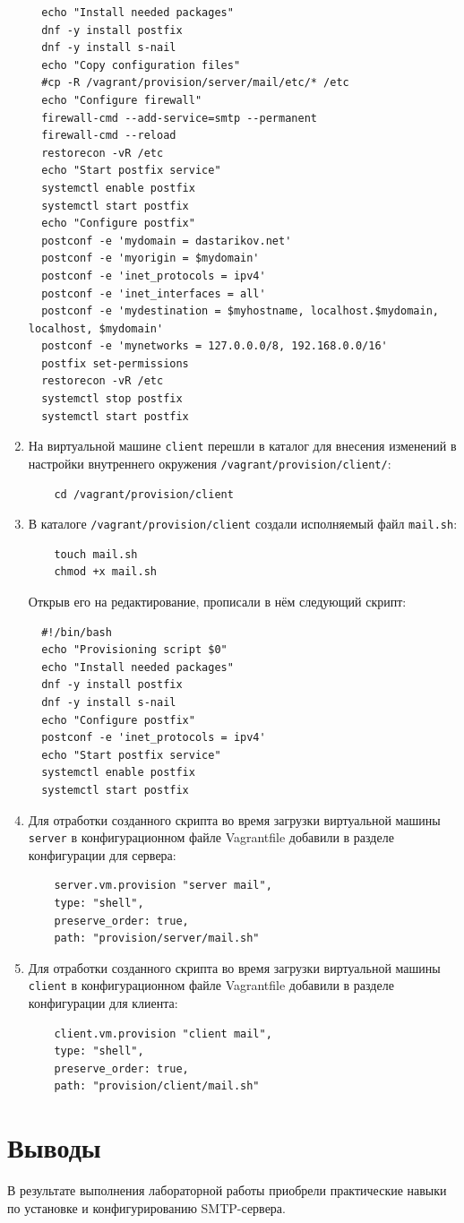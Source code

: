 \begin{enumerate}
\begin{verbatim}
  echo "Install needed packages"
  dnf -y install postfix
  dnf -y install s-nail
  echo "Copy configuration files"
  #cp -R /vagrant/provision/server/mail/etc/* /etc
  echo "Configure firewall"
  firewall-cmd --add-service=smtp --permanent
  firewall-cmd --reload
  restorecon -vR /etc
  echo "Start postfix service"
  systemctl enable postfix
  systemctl start postfix
  echo "Configure postfix"
  postconf -e 'mydomain = dastarikov.net'
  postconf -e 'myorigin = $mydomain'
  postconf -e 'inet_protocols = ipv4'
  postconf -e 'inet_interfaces = all'
  postconf -e 'mydestination = $myhostname, localhost.$mydomain, localhost, $mydomain'
  postconf -e 'mynetworks = 127.0.0.0/8, 192.168.0.0/16'
  postfix set-permissions
  restorecon -vR /etc
  systemctl stop postfix
  systemctl start postfix
\end{verbatim}
\item На виртуальной машине \texttt{client} перешли в каталог для внесения изменений в настройки внутреннего окружения \texttt{/vagrant/provision/client/}:
  \begin{verbatim}
    cd /vagrant/provision/client
  \end{verbatim}
\item В каталоге \texttt{/vagrant/provision/client} создали исполняемый файл \texttt{mail.sh}:
  \begin{verbatim}
    touch mail.sh
    chmod +x mail.sh
  \end{verbatim}
Открыв его на редактирование, прописали в нём следующий скрипт:
\begin{verbatim}
  #!/bin/bash
  echo "Provisioning script $0"
  echo "Install needed packages"
  dnf -y install postfix
  dnf -y install s-nail
  echo "Configure postfix"
  postconf -e 'inet_protocols = ipv4'
  echo "Start postfix service"
  systemctl enable postfix
  systemctl start postfix
\end{verbatim}

\item Для отработки созданного скрипта во время загрузки виртуальной машины \texttt{server} в конфигурационном файле Vagrantfile добавили в разделе конфигурации для сервера:
  \begin{verbatim}
    server.vm.provision "server mail",
    type: "shell",
    preserve_order: true,
    path: "provision/server/mail.sh"
  \end{verbatim}
\item Для отработки созданного скрипта во время загрузки виртуальной машины \texttt{client} в конфигурационном файле Vagrantfile добавили в разделе конфигурации для клиента:
  \begin{verbatim}
    client.vm.provision "client mail",
    type: "shell",
    preserve_order: true,
    path: "provision/client/mail.sh"
  \end{verbatim}
\end{enumerate}

\section{Выводы}
В результате выполнения лабораторной работы приобрели практические навыки по установке и конфигурированию SMTP-сервера.


